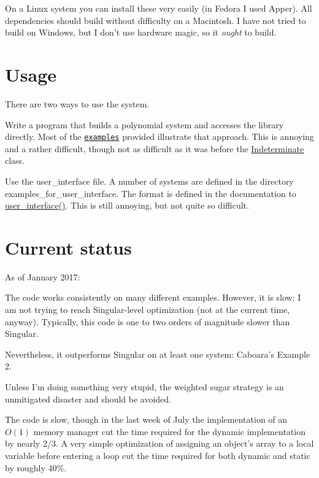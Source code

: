 On a Linux system you can install these very easily (in Fedora I used {\ttfamily Apper}). All dependencies should build without difficulty on a Macintosh. I have not tried to build on Windows, but I don't use hardware magic, so it {\itshape ought} to build.\hypertarget{index_Usage}{}\section{Usage}\label{index_Usage}
There are two ways to use the system.
\begin{DoxyEnumerate}
\item Write a program that builds a polynomial system and accesses the library directly. Most of the \href{examples.html}{\tt examples} provided illustrate that approach. This is annoying and a rather difficult, though not as difficult as it was before the \hyperlink{group__polygroup_class_indeterminate}{Indeterminate} class.
\item Use the {\ttfamily user\+\_\+interface} file. A number of systems are defined in the directory {\ttfamily examples\+\_\+for\+\_\+user\+\_\+interface}. The format is defined in the documentation to \hyperlink{group__utils_ga72d205e8226d578b892515edc527cc83}{user\+\_\+interface()}. This is still annoying, but not quite so difficult.
\end{DoxyEnumerate}\hypertarget{index_Status}{}\section{Current status}\label{index_Status}
As of January 2017\+: \begin{DoxyItemize}
\item The code works consistently on many different examples. However, it is slow\+: I am not trying to reach Singular-\/level optimization (not at the current time, anyway). Typically, this code is one to two orders of magnitude slower than Singular. \item Nevertheless, it outperforms Singular on at least one system\+: Caboara's Example 2. \item Unless I'm doing something very stupid, the weighted sugar strategy is an unmitigated disaster and should be avoided. \item The code is slow, though in the last week of July the implementation of an $O(1)$ memory manager cut the time required for the dynamic implementation by nearly 2/3. A very simple optimization of assigning an object's array to a local variable before entering a loop cut the time required for both dynamic and static by roughly 40\%.\end{DoxyItemize}
